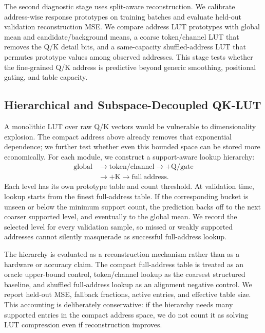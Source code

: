The second diagnostic stage uses split-aware reconstruction. We calibrate
address-wise response prototypes on training batches and evaluate held-out
validation reconstruction MSE. We compare address LUT prototypes with global
mean and candidate/background means, a coarse token/channel LUT that removes
the Q/K detail bits, and a same-capacity shuffled-address LUT that permutes
prototype values among observed addresses. This stage tests whether the
fine-grained Q/K address is predictive beyond generic smoothing, positional
gating, and table capacity.

\subsection{Hierarchical and Subspace-Decoupled QK-LUT}
\label{sec:e5_backoff}

A monolithic LUT over raw Q/K vectors would be vulnerable to dimensionality
explosion. The compact address above already removes that exponential
dependence; we further test whether even this bounded space can be stored more
economically. For each module, we
construct a support-aware lookup hierarchy:
\begin{equation}
  \begin{aligned}
  \mathrm{global}
  &\rightarrow \mathrm{token/channel}
  \rightarrow {+}\mathrm{Q/gate} \\
  &\rightarrow {+}\mathrm{K}
  \rightarrow \mathrm{full\ address}.
  \end{aligned}
\end{equation}
Each level has its own prototype table and count threshold. At validation time,
lookup starts from the finest full-address table. If the corresponding bucket is
unseen or below the minimum support count, the prediction backs off to the next
coarser supported level, and eventually to the global mean. We record the
selected level for every validation sample, so missed or weakly supported
addresses cannot silently masquerade as successful full-address lookup.

The hierarchy is evaluated as a reconstruction mechanism rather than as a
hardware or accuracy claim. The compact full-address table is treated as an oracle
upper-bound control, token/channel lookup as the coarsest structured baseline,
and shuffled full-address lookup as an alignment negative control. We report
held-out MSE, fallback fractions, active entries, and effective table size.
This accounting is deliberately conservative: if the hierarchy needs many
supported entries in the compact address space, we do not count it as solving
LUT compression even if reconstruction improves.

